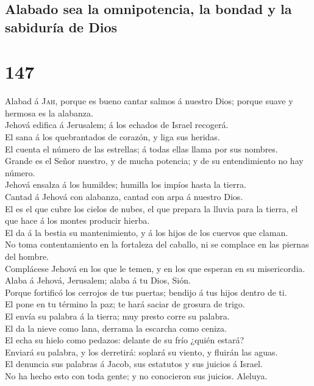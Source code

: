 \hypertarget{alabado-sea-la-omnipotencia-la-bondad-y-la-sabiduruxeda-de-dios}{%
\subsection{Alabado sea la omnipotencia, la bondad y la sabiduría de
Dios}\label{alabado-sea-la-omnipotencia-la-bondad-y-la-sabiduruxeda-de-dios}}

\hypertarget{section-19-147}{%
\section{147}\label{section-19-147}}

 Alabad á \textsc{Jah}, porque es bueno cantar salmos á
nuestro Dios; porque suave y hermosa es la alabanza.\\
 Jehová edifica á Jerusalem; á los echados de Israel
recogerá.\\
 El sana á los quebrantados de corazón, y liga sus
heridas.\\
 El cuenta el número de las estrellas; á todas ellas llama
por sus nombres.\\
 Grande es el Señor nuestro, y de mucha potencia; y de su
entendimiento no hay número.\\
 Jehová ensalza á los humildes; humilla los impíos hasta
la tierra.\\
 Cantad á Jehová con alabanza, cantad con arpa á nuestro
Dios.\\
 El es el que cubre los cielos de nubes, el que prepara la
lluvia para la tierra, el que hace á los montes producir hierba.\\
 El da á la bestia su mantenimiento, y á los hijos de los
cuervos que claman.\\
 No toma contentamiento en la fortaleza del caballo, ni
se complace en las piernas del hombre.\\
 Complácese Jehová en los que le temen, y en los que
esperan en su misericordia.\\
 Alaba á Jehová, Jerusalem; alaba á tu Dios, Sión.\\
 Porque fortificó los cerrojos de tus puertas; bendijo á
tus hijos dentro de ti.\\
 El pone en tu término la paz; te hará saciar de grosura
de trigo.\\
 El envía su palabra á la tierra; muy presto corre su
palabra.\\
 El da la nieve como lana, derrama la escarcha como
ceniza.\\
 El echa su hielo como pedazos: delante de su frío ¿quién
estará?\\
 Enviará su palabra, y los derretirá: soplará su viento,
y fluirán las aguas.\\
 El denuncia sus palabras á Jacob, sus estatutos y sus
juicios á Israel.\\
 No ha hecho esto con toda gente; y no conocieron sus
juicios. Aleluya.


